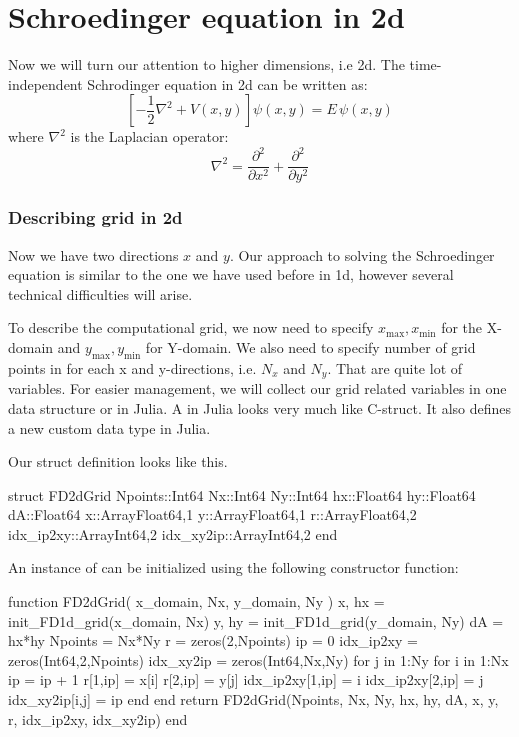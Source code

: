 \chapter{Schroedinger equation in 2d}

Now we will turn our attention to higher dimensions, i.e 2d.
The time-independent Schrodinger equation in 2d can be written as:
\begin{equation}
\left[ -\frac{1}{2}\nabla^2 + V(x,y) \right] \psi(x,y) = E\,\psi(x,y)
\label{eq:sch_2d}
\end{equation}
%
where $\nabla^2$ is the Laplacian operator:
%
\begin{equation}
\nabla^2 = \frac{\partial^2}{\partial x^2} + \frac{\partial^2}{\partial y^2}
\end{equation}



\subsection{Describing grid in 2d}

Now we have two directions $x$ and $y$. Our approach to solving the Schroedinger equation
is similar to the one we have used before in 1d, however several technical difficulties
will arise.

To describe the computational grid, we now need to specify
$x_{\mathrm{max}}, x_{\mathrm{min}}$ for the X-domain
and $y_{\mathrm{max}}, y_{\mathrm{min}}$ for Y-domain. We also need to specify number of grid
points in for each x and y-directions, i.e. $N_{x}$ and $N_{y}$. That are quite lot of variables.
For easier management, we will collect our grid related variables in one data structure or
 in Julia. A  in Julia looks very much like C-struct.
It also defines a new custom data type in Julia.

Our struct definition looks like this.
\begin{juliacode}
struct FD2dGrid
    Npoints::Int64
    Nx::Int64
    Ny::Int64
    hx::Float64
    hy::Float64
    dA::Float64
    x::Array{Float64,1}
    y::Array{Float64,1}
    r::Array{Float64,2}
    idx_ip2xy::Array{Int64,2}
    idx_xy2ip::Array{Int64,2}
end
\end{juliacode}
%
An instance of  can be initialized using the following constructor function:
%
\begin{juliacode}
function FD2dGrid( x_domain, Nx, y_domain, Ny )
  x, hx = init_FD1d_grid(x_domain, Nx)
  y, hy = init_FD1d_grid(y_domain, Ny)
  dA = hx*hy
  Npoints = Nx*Ny
  r = zeros(2,Npoints)
  ip = 0
  idx_ip2xy = zeros(Int64,2,Npoints)
  idx_xy2ip = zeros(Int64,Nx,Ny)
  for j in 1:Ny
    for i in 1:Nx
      ip = ip + 1
      r[1,ip] = x[i]
      r[2,ip] = y[j]
      idx_ip2xy[1,ip] = i
      idx_ip2xy[2,ip] = j
      idx_xy2ip[i,j] = ip
    end
  end
  return FD2dGrid(Npoints, Nx, Ny, hx, hy, dA, x, y, r, idx_ip2xy, idx_xy2ip) 
end
\end{juliacode}

